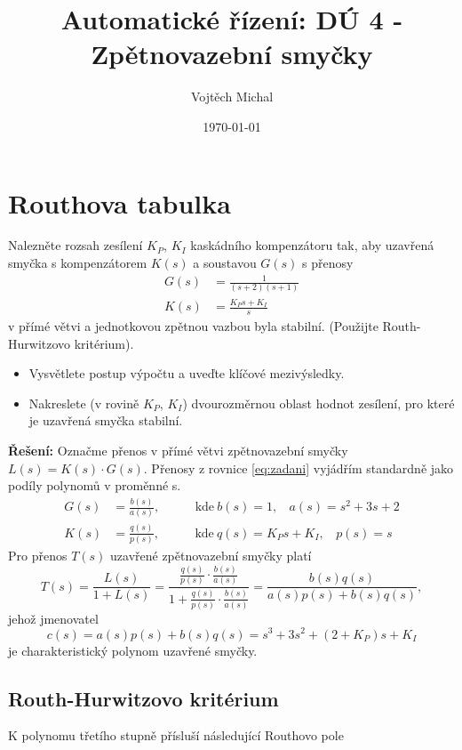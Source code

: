 \documentclass[twoside]{article}
\title{Automatické řízení: DÚ 4 - Zpětnovazební smyčky}
\author{Vojtěch Michal}
\date{\today}
\begin{document}
\maketitle

\section{Routhova tabulka}
Nalezněte rozsah zesílení $K_P$, $K_I$ kaskádního kompenzátoru tak, aby uzavřená smyčka s kompenzátorem $K(s)$ a soustavou $G(s)$
s přenosy
\begin{equation}
	\begin{split}
		\label{eq:zadani}
		G(s) &= \frac{1}{(s+2)(s+1)} \\
		K(s) &= \frac{K_P s + K_I}{s}
	\end{split}
\end{equation}
v přímé větvi a jednotkovou zpětnou vazbou byla stabilní. (Použijte Routh-Hurwitzovo kritérium).
\begin{itemize}
	\item Vysvětlete postup výpočtu a uveďte klíčové mezivýsledky.
	\item Nakreslete (v rovině $K_P$, $K_I$) dvourozměrnou oblast hodnot zesílení, pro které je uzavřená smyčka stabilní.
\end{itemize}
\textbf{Řešení:} 
Označme přenos v přímé větvi zpětnovazební smyčky $L(s) = K(s) \cdot G(s)$. Přenosy z rovnice \eqref{eq:zadani} 
vyjádřím standardně jako podíly polynomů v proměnné s. 
\begin{equation}
	\begin{split}
		G(s) &= \frac{b(s)}{a(s)} \text{, ~~~~~~~ kde} ~ b(s) = 1,~~~~ a(s) = s^2 + 3s + 2 \\
		K(s) &= \frac{q(s)}{p(s)} \text{, ~~~~~~~ kde} ~ q(s) = K_P s + K_I,~~~~ p(s) = s 
	\end{split}
\end{equation}
Pro přenos $T(s)$ uzavřené zpětnovazební smyčky platí
\begin{equation}
	T(s) = \frac{L(s)}{1 + L(s)} = \frac{\frac{q(s)}{p(s)} \cdot \frac{b(s)}{a(s)}}{1 + \frac{q(s)}{p(s)} \cdot \frac{b(s)}{a(s)}}
	=  \frac{b(s)q(s)}{a(s)p(s) + b(s)q(s)},
\end{equation}
jehož jmenovatel
\begin{equation}
	c(s) = a(s)p(s) + b(s)q(s) = s^3 + 3s^2 + (2+ K_P)s + K_I
	\label{eq:char_polynom}
\end{equation}
je charakteristický polynom uzavřené smyčky.
\subsection{Routh-Hurwitzovo kritérium}
K polynomu třetího stupně přísluší následující Routhovo pole
\end{document}
